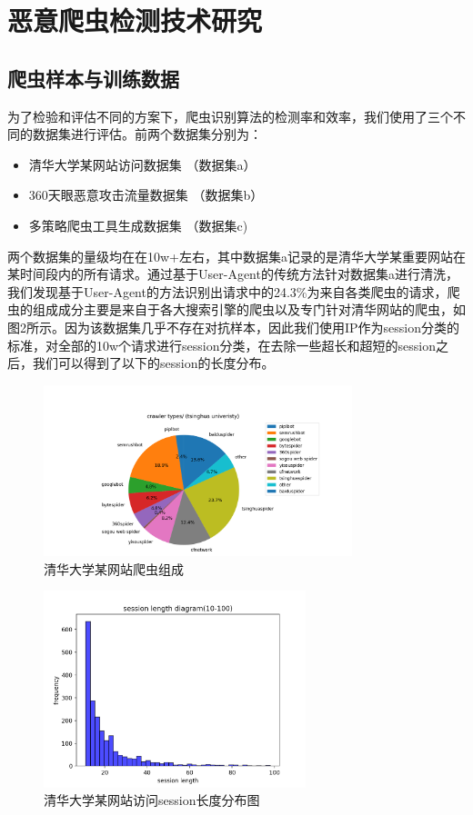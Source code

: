 \documentclass[doctor,privacy,twoside]{buaa_mac}
\begin{document}
\chapter{恶意爬虫检测技术研究}

\section{爬虫样本与训练数据}
为了检验和评估不同的方案下，爬虫识别算法的检测率和效率，我们使用了三个不同的数据集进行评估。前两个数据集分别为：
\begin{itemize}
\item 清华大学某网站访问数据集 （数据集a）
\item 360天眼恶意攻击流量数据集 （数据集b）
\item 多策略爬虫工具生成数据集 （数据集c)
\end{itemize}

两个数据集的量级均在在10w+左右，其中数据集a记录的是清华大学某重要网站在某时间段内的所有请求。通过基于User-Agent的传统方法针对数据集a进行清洗，我们发现基于User-Agent的方法识别出请求中的24.3\%为来自各类爬虫的请求，爬虫的组成成分主要是来自于各大搜索引擎的爬虫以及专门针对清华网站的爬虫，如图2所示。因为该数据集几乎不存在对抗样本，因此我们使用IP作为session分类的标准，对全部的10w个请求进行session分类，在去除一些超长和超短的session之后，我们可以得到了以下的session的长度分布。

\centerline{}
\begin{figure}[!h]
  \centering
  \includegraphics[width=0.8\textwidth]{images/THU_crawler_types.png}
  \caption{清华大学某网站爬虫组成}
  \label{fig:logo}
\end{figure}
\centerline{}

\centerline{}
\begin{figure}[!h]
  \centering
  \includegraphics[width=0.68\textwidth]{images/session_len_10_100.png}
  \caption{清华大学某网站访问session长度分布图}
  \label{fig:logo}
\end{figure}
\centerline{}
\end{document}
